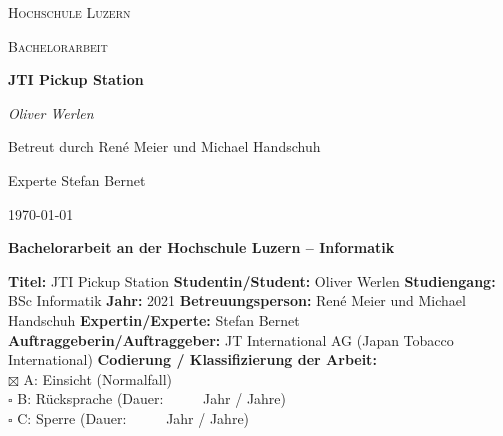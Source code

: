
		{\scshape\LARGE Hochschule Luzern\par}
		\vspace{1cm}
		{\scshape\Large Bachelorarbeit\par}
		\vspace{1.5cm}
		{\huge\bfseries JTI Pickup Station\par}
		\vspace{1.5cm}
		{\Large\itshape Oliver Werlen\par}
		
		\vfill
		Betreut durch René Meier und Michael Handschuh\par
		Experte Stefan Bernet
		\vfill
		{\large \today\par}
	\newpage
	
	\noindent
	\fontsize{12}{14}
	\textbf{Bachelorarbeit an der Hochschule Luzern -- Informatik} \\ \vspace*{0.6cm}
	
	\fontsize{10.5}{12}
	\noindent
	\textbf{Titel:} JTI Pickup Station \newline \newline
	\textbf{Studentin/Student:} Oliver Werlen \newline \newline
	\textbf{Studiengang:} BSc Informatik \newline \newline
	\textbf{Jahr:} 2021\newline \newline
	\textbf{Betreuungsperson:} René Meier und Michael Handschuh \newline \newline
	\textbf{Expertin/Experte:} Stefan Bernet \newline \newline
	\textbf{Auftraggeberin/Auftraggeber:} JT International AG (Japan Tobacco International) \newline \newline \newline
	\textbf{Codierung / Klassifizierung der Arbeit:}\\
	$\boxtimes$ A: Einsicht 	(Normalfall) \\
	$\square$ B: R\"ucksprache	(Dauer:  \ \ \ \ \     Jahr / Jahre)\\
	$\square$ C: Sperre	(Dauer:  \ \ \ \ \     Jahr / Jahre)\\
	
